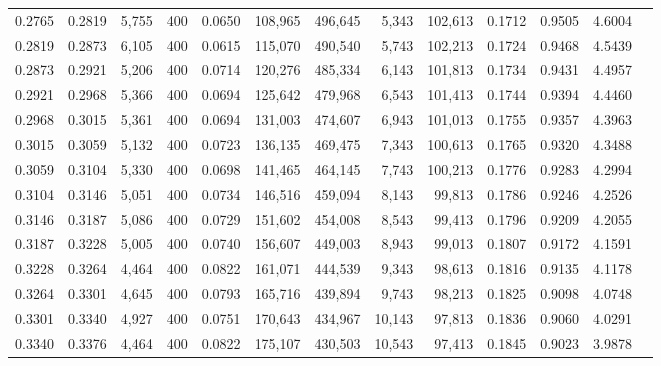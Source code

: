 \begin{tabular}{rrrrrrrrrrrrr}
0.2765 & 0.2819 &  5,755 & 400 &                                     0.0650 & 108,965 & 496,645 &   5,343 & 102,613 & 0.1712 & 0.9505 & 4.6004 \\
0.2819 & 0.2873 &  6,105 & 400 &                                     0.0615 & 115,070 & 490,540 &   5,743 & 102,213 & 0.1724 & 0.9468 & 4.5439 \\
0.2873 & 0.2921 &  5,206 & 400 &                                     0.0714 & 120,276 & 485,334 &   6,143 & 101,813 & 0.1734 & 0.9431 & 4.4957 \\
0.2921 & 0.2968 &  5,366 & 400 &                                     0.0694 & 125,642 & 479,968 &   6,543 & 101,413 & 0.1744 & 0.9394 & 4.4460 \\
0.2968 & 0.3015 &  5,361 & 400 &                                     0.0694 & 131,003 & 474,607 &   6,943 & 101,013 & 0.1755 & 0.9357 & 4.3963 \\
0.3015 & 0.3059 &  5,132 & 400 &                                     0.0723 & 136,135 & 469,475 &   7,343 & 100,613 & 0.1765 & 0.9320 & 4.3488 \\
0.3059 & 0.3104 &  5,330 & 400 &                                     0.0698 & 141,465 & 464,145 &   7,743 & 100,213 & 0.1776 & 0.9283 & 4.2994 \\
0.3104 & 0.3146 &  5,051 & 400 &                                     0.0734 & 146,516 & 459,094 &   8,143 &  99,813 & 0.1786 & 0.9246 & 4.2526 \\
0.3146 & 0.3187 &  5,086 & 400 &                                     0.0729 & 151,602 & 454,008 &   8,543 &  99,413 & 0.1796 & 0.9209 & 4.2055 \\
0.3187 & 0.3228 &  5,005 & 400 &                                     0.0740 & 156,607 & 449,003 &   8,943 &  99,013 & 0.1807 & 0.9172 & 4.1591 \\
0.3228 & 0.3264 &  4,464 & 400 &                                     0.0822 & 161,071 & 444,539 &   9,343 &  98,613 & 0.1816 & 0.9135 & 4.1178 \\
0.3264 & 0.3301 &  4,645 & 400 &                                     0.0793 & 165,716 & 439,894 &   9,743 &  98,213 & 0.1825 & 0.9098 & 4.0748 \\
0.3301 & 0.3340 &  4,927 & 400 &                                     0.0751 & 170,643 & 434,967 &  10,143 &  97,813 & 0.1836 & 0.9060 & 4.0291 \\
0.3340 & 0.3376 &  4,464 & 400 &                                     0.0822 & 175,107 & 430,503 &  10,543 &  97,413 & 0.1845 & 0.9023 & 3.9878 \\

\end{tabular}
